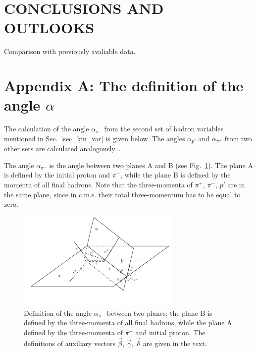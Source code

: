 \documentclass[prc,twocolumn,superscriptaddress,showpacs,amssymb,amsmath,amsfonts,linenumbers,aps]{revtex4-1}
\begin{document}
\section{CONCLUSIONS AND OUTLOOKS}





Comparison with previously avaliable data.

\begin{acknowledgments}


\end{acknowledgments}

\clearpage
\section*{Appendix A: The definition of the angle $\alpha$}
\label{app_a}


The calculation of the angle $\alpha_{\pi^{-}}$ from the second set of hadron variables mentioned in Sec.~\ref{sec_kin_var} is given below. The angles $\alpha_{p'}$ and $\alpha_{\pi^{+}}$ from two other sets are calculated analogously~\cite{Fed_an_note:2017}.

The angle $\alpha_{\pi^{-}}$ is the angle between two planes A and B (see Fig.~\ref{fig:cr_sec_kinematic2}).
The plane A is defined by
the initial proton and $\pi^{-}$, while the plane B is defined by the momenta of
all final hadrons. Note that the three-momenta of $\pi^{+}$,
$\pi^{-}$, $p'$ are in the same plane, since in c.m.s.
their total three-momentum has to be equal to zero.


\begin{figure}[htp]
\begin{center}
\includegraphics[width=8cm]{pictures/angles/alpha1.pdf}
\caption{\small Definition of the angle $\alpha_{\pi^{-}}$ between two planes: the plane B is defined by the three-momenta of all final hadrons, while the plane A defined by  the three-momenta of $\pi^{-}$ and initial proton. The definitions of  auxiliary vectors $\vec \beta$, $\vec \gamma$, $\vec \delta$ are given in the text.} \label{fig:cr_sec_kinematic2}
\end{center}
\end{figure}
\end{document}
